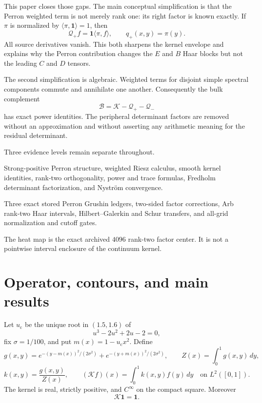 \documentclass[11pt]{article}
\theoremstyle{definition}
\theoremstyle{remark}
\newcommand{\cK}{\mathcal K}
\newcommand{\cB}{\mathcal B}
\newcommand{\cQ}{\mathcal Q}
\newcommand{\uc}{u_{\mathrm c}}
\begin{document}
This paper closes those gaps.  The main conceptual simplification is that
the Perron weighted term is not merely rank one: its right factor is known
exactly.  If $\pi$ is normalized by $\langle\pi,\mathbf1\rangle=1$, then
\begin{equation}
 \cQ_+f
 =\mathbf1\langle\pi,f\rangle,
 \qquad q_+(x,y)=\pi(y).
 \label{eq:perron-kernel-intro}
\end{equation}
All source derivatives vanish.  This both sharpens the kernel envelope and
explains why the Perron contribution changes the $E$ and $B$ Haar blocks
but not the leading $C$ and $D$ tensors.

The second simplification is algebraic.  Weighted terms for disjoint simple
spectral components commute and annihilate one another.  Consequently the
bulk complement
\begin{equation}
 \cB=\cK-\cQ_+-\cQ_-
 \label{eq:bulk-intro}
\end{equation}
has exact power identities.  The peripheral determinant factors are removed
without an approximation and without asserting any arithmetic meaning for
the residual determinant.

Three evidence levels remain separate throughout.
\begin{description}[leftmargin=3.2cm,style=nextline]
 \item[Analytic theorem]
 Strong-positive Perron structure, weighted Riesz calculus, smooth kernel
 identities, rank-two orthogonality, power and trace formulas, Fredholm
 determinant factorization, and Nystr\"om convergence.
 \item[Outward certificate]
 Three exact stored Perron Grushin ledgers, two-sided factor corrections,
 Arb rank-two Haar intervals, Hilbert--Galerkin and Schur transfers, and
 all-grid normalization and cutoff gates.
 \item[Displayed center]
 The heat map is the exact archived $4096$ rank-two factor center.  It is not
 a pointwise interval enclosure of the continuum kernel.
\end{description}

\section{Operator, contours, and main results}
\label{sec:model}

Let $\uc$ be the unique root in $(1.5,1.6)$ of
\[
 u^3-2u^2+2u-2=0,
\]
fix $\sigma=1/100$, and put $m(x)=1-\uc x^2$.  Define
\[
 g(x,y)=
 e^{-(y-m(x))^2/(2\sigma^2)}
 +e^{-(y+m(x))^2/(2\sigma^2)},
 \qquad
 Z(x)=\int_0^1g(x,y)\,dy,
\]
\begin{equation}
 k(x,y)=\frac{g(x,y)}{Z(x)},
 \qquad
 (\cK f)(x)=\int_0^1k(x,y)f(y)\,dy
 \quad\text{on }L^2([0,1]).
 \label{eq:operator}
\end{equation}
The kernel is real, strictly positive, and $C^\infty$ on the compact
square.  Moreover
\begin{equation}
 \cK\mathbf1=\mathbf1.
 \label{eq:markov}
\end{equation}
\end{document}
